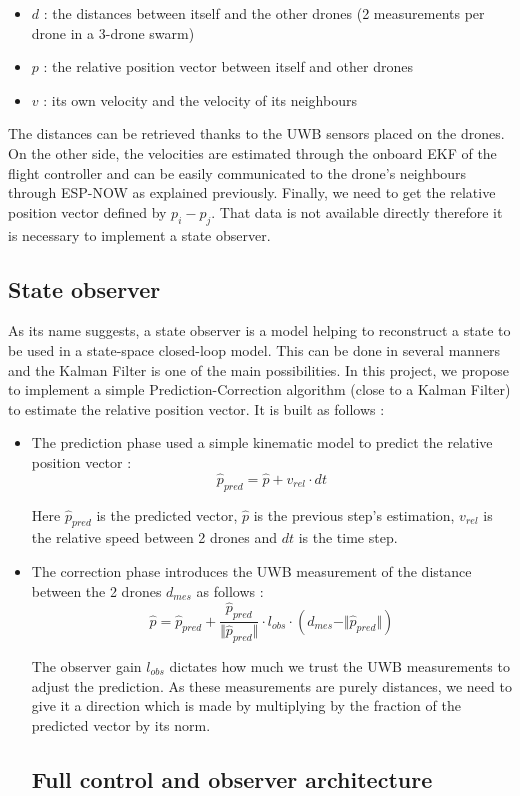 \documentclass[conference]{IEEEtran}
\begin{document}
\begin{itemize}
    \item $d$ : the distances between itself and the other drones (2 measurements per drone in a 3-drone swarm)
    \item $p$ : the relative position vector between itself and other drones
    \item $v$ : its own velocity and the velocity of its neighbours    
\end{itemize}

The distances can be retrieved thanks to the UWB sensors placed on the drones. On the other side, the velocities are estimated through the onboard EKF of the flight controller and can be easily communicated to the drone's neighbours through ESP-NOW as explained previously. Finally, we need to get the relative position vector defined by $p_i-p_j$. That data is not available directly therefore it is necessary to implement a state observer.


\subsection{State observer}

As its name suggests, a state observer is a model helping to reconstruct a state to be used in a state-space closed-loop model. This can be done in several manners and the Kalman Filter is one of the main possibilities. In this project, we propose to implement a simple Prediction-Correction algorithm (close to a Kalman Filter) to estimate the relative position vector. It is built as follows :

\begin{itemize}
    \item The prediction phase used a simple kinematic model to predict the relative position vector :
    $$\hat{p}_{pred}=\hat{p}+v_{rel}\cdot dt$$

    Here $\hat{p}_{pred}$ is the predicted vector, $\hat{p}$ is the previous step's estimation, $v_{rel}$ is the relative speed between 2 drones and $dt$ is the time step.

    \item The correction phase introduces the UWB measurement of the distance between the 2 drones $d_{mes}$ as follows : 
    \begin{equation*}
        \hat{p}= \hat{p}_{pred}+\frac{\hat{p}_{pred}}{\Vert \hat{p}_{pred}\Vert} \cdot l_{obs} \cdot (d_{mes}-\Vert \hat{p}_{pred}\Vert)
    \end{equation*}

    The observer gain $l_{obs}$ dictates how much we trust the UWB measurements to adjust the prediction. As these measurements are purely distances, we need to give it a direction which is made by multiplying by the fraction of the predicted vector by its norm. 

    \subsection{Full control and observer architecture}

\end{itemize}
\end{document}
